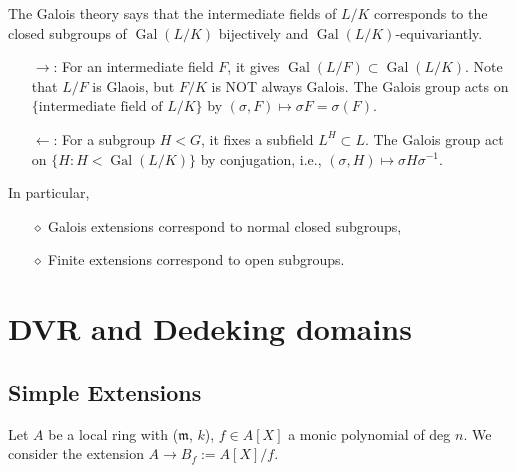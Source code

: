 \documentclass{article}
\theoremstyle{definition}
\theoremstyle{remark}
\DeclareMathOperator{\gal}{Gal}
\begin{document}
The Galois theory says that the intermediate fields of $L/K$ corresponds to the closed subgroups of $\gal(L/K)$ bijectively and $\gal(L/K)$-equivariantly.
\begin{enumerate}
    \item [$\rightarrow$:] For an intermediate field $F$, it gives $\gal(L/F)\subset \gal(L/K)$. Note that $L/F$ is Glaois, but $F/K$ is NOT always Galois.
    The Galois group acts on $\{\text{intermediate field of } L/K\}$ by $(\sigma, F) \mapsto \sigma F = \sigma(F)$.
    \item [$\leftarrow$:] For a subgroup $H < G$, it fixes a subfield $L^H \subset L$. The Galois group act on $\{H : H < \gal(L/K)\}$ by conjugation, i.e., $(\sigma, H) \mapsto \sigma H\sigma^{-1}$.
\end{enumerate}
In particular,\begin{enumerate}
    \item [$\diamond$] Galois extensions correspond to normal closed subgroups,
    \item [$\diamond$] Finite extensions correspond to open subgroups.
\end{enumerate}

\section{DVR and Dedeking domains}

\subsection{Simple Extensions}
Let $A$ be a local ring with ($\mathfrak{m}$, $k$), $f\in A[X]$ a monic polynomial of deg $n$.
We consider the extension $A \to B_f := A[X]/f$.
\end{document}
